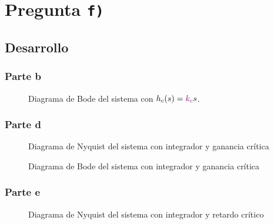 \section{Pregunta \texttt{f)}}\label{pregunta-f}


\subsection{Desarrollo}

\subsubsection{Parte b}

%   

\begin{figure}[h]
  \centering
  
  \caption{Diagrama de Bode del sistema con $h_{c}(s) = \mathbin{\color{violet}k_{c}}\mathbin{s}$.}
  \label{fig:bode-f1}
\end{figure}

\subsubsection{Parte d}

\begin{figure}[h]
  \centering
  
  \caption{Diagrama de Nyquist del sistema con integrador y ganancia crítica}
  \label{fig:nyquist-f2}
\end{figure}

\begin{figure}[h]
  \centering
  
  \caption{Diagrama de Bode del sistema con integrador y ganancia crítica}
  \label{fig:bode-f2}
\end{figure}

\subsubsection{Parte e}

\begin{figure}[h]
  \centering
  
  \caption{Diagrama de Nyquist del sistema con integrador y retardo crítico}
  \label{fig:nyquist-f3}
\end{figure}

